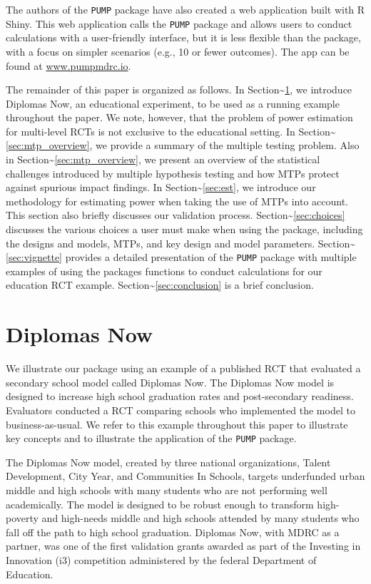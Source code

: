 \documentclass[
]{article}
\begin{document}
The authors of the \texttt{PUMP} package have also created a web
application built with R Shiny. This web application calls the
\texttt{PUMP} package and allows users to conduct calculations with a
user-friendly interface, but it is less flexible than the package, with
a focus on simpler scenarios (e.g., 10 or fewer outcomes). The app can
be found at \url{www.pumpmdrc.io}.

The remainder of this paper is organized as follows. In
Section\textasciitilde{}\ref{sec:diplomas}, we introduce Diplomas Now,
an educational experiment, to be used as a running example throughout
the paper. We note, however, that the problem of power estimation for
multi-level RCTs is not exclusive to the educational setting. In
Section\textasciitilde{}\ref{sec:mtp_overview}, we provide a summary of
the multiple testing problem. Also in
Section\textasciitilde{}\ref{sec:mtp_overview}, we present an overview
of the statistical challenges introduced by multiple hypothesis testing
and how MTPs protect against spurious impact findings. In
Section\textasciitilde{}\ref{sec:est}, we introduce our methodology for
estimating power when taking the use of MTPs into account. This section
also briefly discusses our validation process.
Section\textasciitilde{}\ref{sec:choices} discusses the various choices
a user must make when using the package, including the designs and
models, MTPs, and key design and model parameters.
Section\textasciitilde{}\ref{sec:vignette} provides a detailed
presentation of the \texttt{PUMP} package with multiple examples of
using the packages functions to conduct calculations for our education
RCT example. Section\textasciitilde{}\ref{sec:conclusion} is a brief
conclusion.

\section{Diplomas Now}
\label{sec:diplomas}

We illustrate our package using an example of a published RCT that
evaluated a secondary school model called Diplomas Now. The Diplomas Now
model is designed to increase high school graduation rates and
post-secondary readiness. Evaluators conducted a RCT comparing schools
who implemented the model to business-as-usual. We refer to this example
throughout this paper to illustrate key concepts and to illustrate the
application of the \texttt{PUMP} package.

The Diplomas Now model, created by three national organizations, Talent
Development, City Year, and Communities In Schools, targets underfunded
urban middle and high schools with many students who are not performing
well academically. The model is designed to be robust enough to
transform high-poverty and high-needs middle and high schools attended
by many students who fall off the path to high school graduation.
Diplomas Now, with MDRC as a partner, was one of the first validation
grants awarded as part of the Investing in Innovation (i3) competition
administered by the federal Department of Education.
\end{document}

